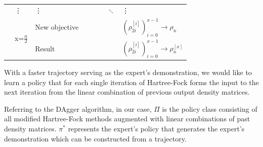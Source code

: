 \documentclass[twoside,11pt]{article}
\begin{document}
\begin{center}
\begin{table}[t]
\begin{tabular}{|l|l|l|l|l|l|l|l|}
	& \vdots      & \vdots      &                &                &                & $\ddots$ &   \vdots \\ \cline{2-8} 
	& \multirow{2}{*}{ x=$\frac{n}{2}$} & New objective         &                         &                          &                            &  & $(\rho_{2i}^{[i]})_{i=0}^{x-1} \rightarrow \rho_{n}$     \\ \cline{3-8} 
	&                & Result  &                &                &                &  & $(\rho_{2i}^{[i]})_{i=0}^{x-1}\rightarrow \rho_{n}^{[x]}$ \\ \hline
	\end{tabular}
	\end{table}
\end{center} 




% 

With a faster trajectory serving as the expert's demonstration, we would like to learn a policy that for each single iteration of Hartree-Fock forms the input to the next iteration from the linear combination of previous output density matrices.   

Referring to the DAgger algorithm, in our case, $\Pi$ is the policy class consisting of all modified Hartree-Fock methods augmented with linear combinations of past density matrices. $\pi^*$ represents the expert's policy that generates the expert's demonstration which can be constructed from a trajectory. 




\end{document}
